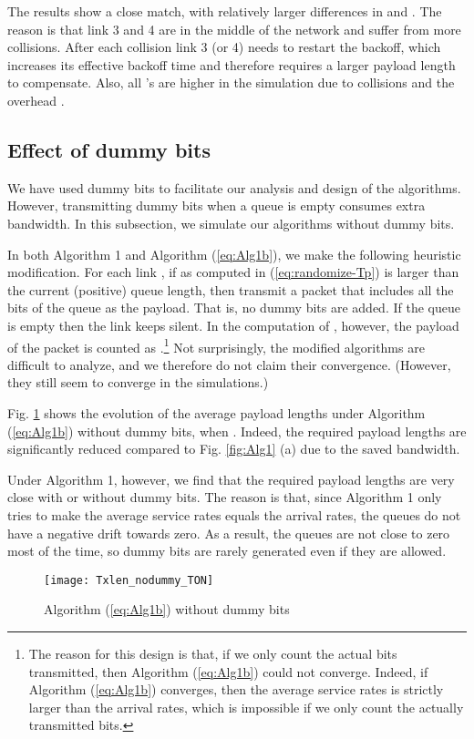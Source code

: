 \documentclass{IEEEtran}
\begin{document}
The results show a close match, with relatively larger differences
in  and . The reason is that link 3 and 4 are in the
middle of the network and suffer from more collisions. After each
collision link 3 (or 4) needs to restart the backoff, which increases
its effective backoff time and therefore requires a larger payload
length to compensate. Also, all 's are higher in the simulation
due to collisions and the overhead .


\subsection{\label{sub:dummy_bits}Effect of dummy bits}

We have used dummy bits to facilitate our analysis and design of the
algorithms. However, transmitting dummy bits when a queue is empty
consumes extra bandwidth. In this subsection, we simulate our algorithms
without dummy bits.

In both Algorithm 1 and Algorithm (\ref{eq:Alg1b}), we make the following
heuristic modification. For each link , if 
as computed in (\ref{eq:randomize-Tp}) is larger than the current
(positive) queue length, then transmit a packet that includes all
the bits of the queue as the payload. That is, no dummy bits are added.
If the queue is empty then the link keeps silent. In the computation
of , however, the payload of the packet is counted as
.\footnote{The reason for this design is that, if we only count the actual bits
transmitted, then Algorithm (\ref{eq:Alg1b}) could not converge.
Indeed, if Algorithm (\ref{eq:Alg1b}) converges, then the average
service rates is strictly larger than the arrival rates, which is
impossible if we only count the actually transmitted bits.} Not surprisingly, the modified algorithms are difficult to analyze,
and we therefore do not claim their convergence. (However, they still
seem to converge in the simulations.)

Fig. \ref{fig:nodummypkt} shows the evolution of the average payload
lengths under Algorithm (\ref{eq:Alg1b}) without dummy bits, when
. Indeed, the required payload lengths are significantly
reduced compared to Fig. \ref{fig:Alg1} (a) due to the saved bandwidth. 

Under Algorithm 1, however, we find that the required payload lengths
are very close with or without dummy bits. The reason is that, since
Algorithm 1 only tries to make the average service rates equals the
arrival rates, the queues do not have a negative drift towards zero.
As a result, the queues are not close to zero most of the time, so
dummy bits are rarely generated even if they are allowed. \begin{figure}
\begin{centering}
\texttt{[image: Txlen\_nodummy\_TON]}
\par\end{centering}

\caption{\label{fig:nodummypkt}Algorithm (\ref{eq:Alg1b}) without dummy bits}



\end{figure}
\end{document}
